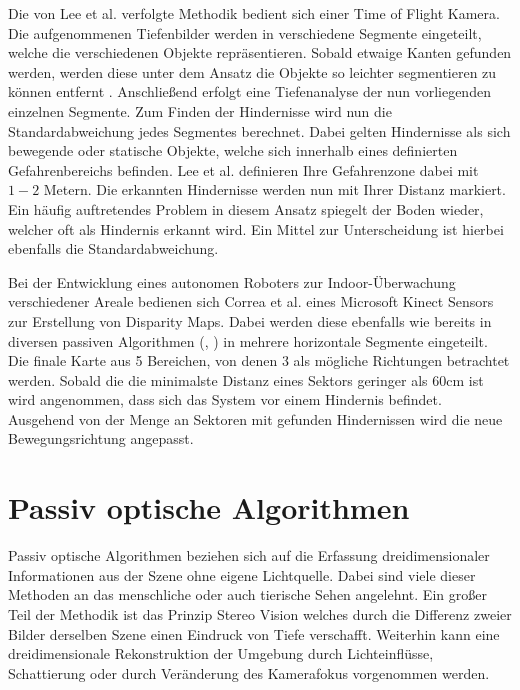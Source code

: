 \noindent
Die von Lee et al. \cite{lee2012intelligent} verfolgte Methodik bedient sich einer Time of Flight Kamera. Die aufgenommenen Tiefenbilder werden in verschiedene Segmente eingeteilt, welche die verschiedenen Objekte repräsentieren. Sobald etwaige Kanten gefunden werden, werden diese unter dem Ansatz die Objekte so leichter segmentieren zu können entfernt . Anschließend erfolgt eine Tiefenanalyse der nun vorliegenden einzelnen Segmente. Zum Finden der Hindernisse wird nun die Standardabweichung jedes Segmentes berechnet.
Dabei gelten Hindernisse als sich bewegende oder statische Objekte, welche sich innerhalb eines definierten Gefahrenbereichs befinden. Lee et al. definieren Ihre Gefahrenzone dabei mit $1-2$ Metern. Die erkannten Hindernisse werden nun mit Ihrer Distanz markiert. Ein häufig auftretendes Problem in diesem Ansatz spiegelt der Boden wieder, welcher oft als Hindernis erkannt wird. Ein Mittel zur Unterscheidung ist hierbei ebenfalls die Standardabweichung.

\noindent
Bei der Entwicklung eines autonomen Roboters zur Indoor-Überwachung verschiedener Areale bedienen sich Correa et al. \cite{correa2012mobile} eines Microsoft Kinect Sensors zur Erstellung von Disparity Maps. Dabei werden diese ebenfalls wie bereits in diversen passiven Algorithmen (\cite{pire2012stereo}, \cite{kostavelis2010comparative}) in mehrere horizontale Segmente eingeteilt. Die finale Karte aus 5 Bereichen, von denen 3 als mögliche Richtungen betrachtet werden. 
Sobald die die minimalste Distanz eines Sektors geringer als 60cm ist wird angenommen, dass sich das System vor einem Hindernis befindet. Ausgehend von der Menge an Sektoren mit gefunden Hindernissen wird die neue Bewegungsrichtung angepasst.

\section{Passiv optische Algorithmen}
\label{sec:sensor_basierte_he}
Passiv optische Algorithmen beziehen sich auf die Erfassung dreidimensionaler Informationen aus der Szene ohne eigene Lichtquelle. Dabei sind viele dieser Methoden an das menschliche oder auch tierische Sehen angelehnt. Ein großer Teil der Methodik ist das Prinzip Stereo Vision welches durch die Differenz zweier Bilder derselben Szene einen Eindruck von Tiefe verschafft. Weiterhin kann eine dreidimensionale Rekonstruktion der Umgebung durch Lichteinflüsse, Schattierung oder durch Veränderung des Kamerafokus vorgenommen werden.\\


